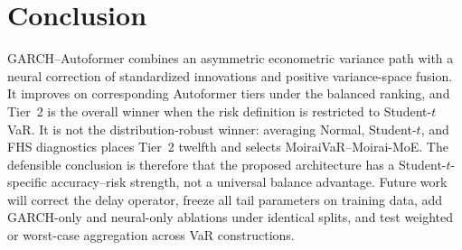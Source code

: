 \documentclass[runningheads]{llncs}
\begin{document}
\section{Conclusion}

GARCH--Autoformer combines an asymmetric econometric variance path with
a neural correction of standardized innovations and positive
variance-space fusion. It improves on corresponding Autoformer tiers
under the balanced ranking, and Tier~2 is the overall winner when the
risk definition is restricted to Student-\(t\) VaR. It is not the
distribution-robust winner: averaging Normal, Student-\(t\), and FHS
diagnostics places Tier~2 twelfth and selects
MoiraiVaR--Moirai-MoE. The defensible conclusion is therefore that the
proposed architecture has a Student-\(t\)-specific accuracy--risk
strength, not a universal balance advantage. Future work will correct
the delay operator, freeze all tail parameters on training data, add
GARCH-only and neural-only ablations under identical splits, and test
weighted or worst-case aggregation across VaR constructions.
\end{document}
